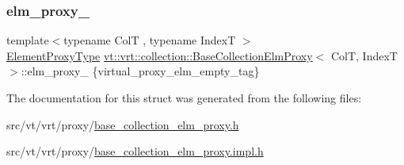 \mbox{\label{structvt_1_1vrt_1_1collection_1_1_base_collection_elm_proxy_a2209d932a492ec78d0d086a51ab9460e}} 
\subsubsection{\texorpdfstring{elm\+\_\+proxy\+\_\+}{elm\_proxy\_}}
{\footnotesize\ttfamily template$<$typename ColT , typename IndexT $>$ \\
\hyperlink{structvt_1_1vrt_1_1collection_1_1_base_collection_elm_proxy_a0f37a49c04c28fdc6ea8665aefc2f40c}{Element\+Proxy\+Type} \hyperlink{structvt_1_1vrt_1_1collection_1_1_base_collection_elm_proxy}{vt\+::vrt\+::collection\+::\+Base\+Collection\+Elm\+Proxy}$<$ ColT, IndexT $>$\+::elm\+\_\+proxy\+\_\+ \{virtual\+\_\+proxy\+\_\+elm\+\_\+empty\+\_\+tag\}\hspace{0.3cm}{\ttfamily [protected]}}



The documentation for this struct was generated from the following files\+:\begin{DoxyCompactItemize}
\item 
src/vt/vrt/proxy/\hyperlink{base__collection__elm__proxy_8h}{base\+\_\+collection\+\_\+elm\+\_\+proxy.\+h}\item 
src/vt/vrt/proxy/\hyperlink{base__collection__elm__proxy_8impl_8h}{base\+\_\+collection\+\_\+elm\+\_\+proxy.\+impl.\+h}\end{DoxyCompactItemize}
